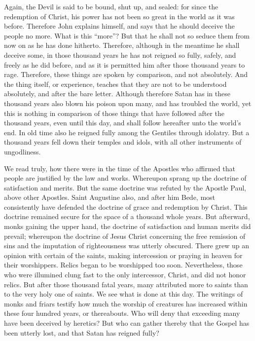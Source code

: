Again, the Devil is said to be bound, shut up, and sealed: for since the redemption of Christ, his power has not been so great in the world as it was before. Therefore John explains himself, and says that he should deceive the people no more. What is this “more”? But that he shall not so seduce them from now on as he has done hitherto. Therefore, although in the meantime he shall deceive some, in those thousand years he has not reigned so fully, safely, and freely as he did before, and as it is permitted him after those thousand years to rage. Therefore, these things are spoken by comparison, and not absolutely. And the thing itself, or experience, teaches that they are not to be understood absolutely, and after the bare letter. Although therefore Satan has in these thousand years also blown his poison upon many, and has troubled the world, yet this is nothing in comparison of those things that have followed after the thousand years, even until this day, and shall follow hereafter unto the world’s end. In old time also he reigned fully among the Gentiles through idolatry. But a thousand years fell down their temples and idols, with all other instruments of ungodliness.

We read truly, how there were in the time of the Apostles who affirmed that people are justified by the law and works. Whereupon sprang up the doctrine of satisfaction and merits. But the same doctrine was refuted by the Apostle Paul, above other Apostles. Saint Augustine also, and after him Bede, most consistently have defended the doctrine of grace and redemption by Christ. This doctrine remained secure for the space of a thousand whole years. But afterward, monks gaining the upper hand, the doctrine of satisfaction and human merits did prevail; whereupon the doctrine of Jesus Christ concerning the free remission of sins and the imputation of righteousness was utterly obscured. There grew up an opinion with certain of the saints, making intercession or praying in heaven for their worshippers. Relics began to be worshipped too soon. Nevertheless, those who were illumined clung fast to the only intercessor, Christ, and did not honor relics. But after those thousand fatal years, many attributed more to saints than to the very holy one of saints. We see what is done at this day. The writings of monks and friars testify how much the worship of creatures has increased within these four hundred years, or thereabouts. Who will deny that exceeding many have been deceived by heretics? But who can gather thereby that the Gospel has been utterly lost, and that Satan has reigned fully?

